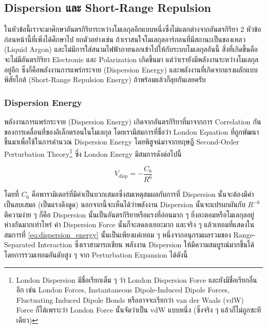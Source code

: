 \subsection{Dispersion และ Short-Range Repulsion}

ในหัวข้อนี้เราจะมาศึกษาอันตรกิริยาระหว่างโมเลกุลอีกแบบหนึ่งซึ่งไม่แตกต่างจากอันตรกิริยา 2 หัวข้อก่อนหน้านี้ที่เพิ่งได้ศึกษาไป ยกตัวอย่างเช่น
ถ้าเราสนใจโมเลกุลอาร์กอนที่มีสถานะเป็นของเหลว (Liquid Argon) และไม่มีการใส่สนามไฟฟ้าภายนอกเข้าไปให้กับระบบโมเลกุลอันนี้
สิ่งที่เกิดขึ้นคือจะไม่มีอันตรกิริยา Electronic และ Polarization เกิดขึ้นมา แต่ว่าเรายังมีพลังงานระหว่างโมเลกุลอยู่อีก
ซึ่งก็คือพลังงานการแพร่กระจาย (Dispersion Energy) และพลังงานที่เกิดจากแรงผลักแบบพิสัยใกล้ (Short-Range Repulsion Energy)
ถ้าพร้อมแล้วก็ลุยกันเลยครับ

\subsubsection{Dispersion Energy}

พลังงานการแพร่กระจาย (Dispersion Energy) เกิดจากอันตรกิริยาที่มาจากการ Correlation กันของการเคลื่อนที่ของอิเล็กตรอนในโมเลกุล
โดยเรามีสมการที่ชื่อว่า London Equation ที่ถูกพัฒนาขึ้นมาเพื่อใช้ในการคำนวณ Dispersion Energy โดยพิสูจน์มาจากทฤษฎี Second-Order
Perturbation Theory\footnote{London Dispersion มีชื่อเรียกเต็ม ๆ ว่า London Dispersion Force และยังมีชื่อเรียกอื่นอีก เช่น
  London Forces, Instantaneous Dipole-Induced Dipole Forces, Fluctuating Induced Dipole Bonds หรืออาจจะเรียกว่า
  van der Waals (vdW) Force ก็ได้เพราะว่า London Force นั้นจัดว่าเป็น vdW แบบหนึ่ง (ซึ่งจริง ๆ แล้วก็ไม่ถูกซะทีเดียว)}
ซึ่ง London Energy มีสมการดังต่อไปนี้\autocite{eisenschitz1930,london1930,london1937}

\begin{equation}
  \label{eq:dispersion_energy}
  V_{\text{disp}}
  =
  - \frac{C_{6}}{R^{6}}
\end{equation}

\noindent โดยที่ $C_{6}$ คือพารามิเตอร์ที่มีค่าเป็นบวกเสมอซึ่งสมเหตุสมผลกับการที่ Dispersion นั้นจะต้องมีค่าเป็นลบเสมอ (เป็นแรงดึงดูด)
นอกจากนี้จะเห็นได้ว่าพลังงาน Dispersion นั้นจะแปรผกผันกับ $R^{-6}$ ตีความง่าย ๆ ก็คือ Dispersion นั้นเป็นอันตรกิริยาหรือแรงที่อ่อนมาก ๆ
ยิ่งอะตอมหรือโมเลกุลอยู่ห่างกันมากเท่าไหร่ ค่า Dispersion Force นั้นก็จะลดลงเยอะมาก และจริง ๆ แล้วเทอมที่แสดงในสมการที่
\eqref{eq:dispersion_energy} นั้นเป็นเพียงแค่เทอม ๆ หนึ่งจากอนุกรมผลรวมของ Range-Separated Interaction ซึ่งเราสามารถเขียน%
พลังงาน Dispersion ให้มีความสมบูรณ์มากขึ้นได้โดยการรวมเทอมอันดับสูง ๆ จาก Perturbation Expansion ได้ดังนี้

